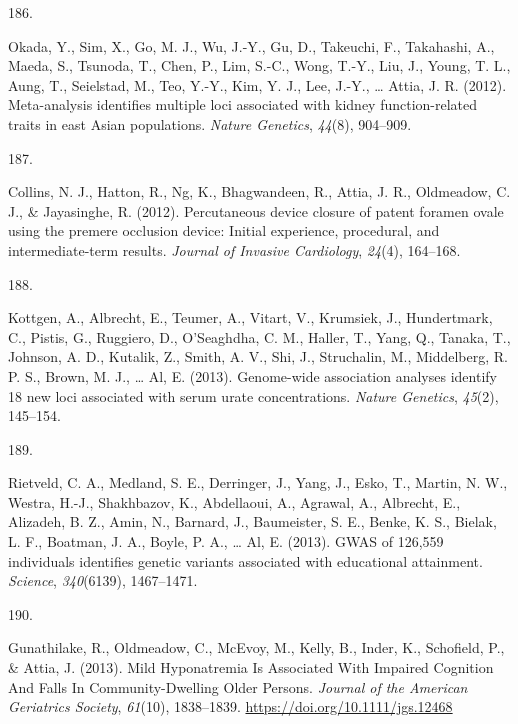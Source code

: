 \documentclass[11pt, a4paper]{awesome-cv}
\newlength{\csllabelwidth}
\newcommand{\CSLLeftMargin}[1]{\parbox[t]{\csllabelwidth}{#1}}
\newcommand{\CSLRightInline}[1]{\parbox[t]{\linewidth - \csllabelwidth}{#1}}
\begin{document}
\leavevmode\hypertarget{ref-okada_meta-analysis_2012}{}%
\CSLLeftMargin{186. }
\CSLRightInline{Okada, Y., Sim, X., Go, M. J., Wu, J.-Y., Gu, D.,
Takeuchi, F., Takahashi, A., Maeda, S., Tsunoda, T., Chen, P., Lim,
S.-C., Wong, T.-Y., Liu, J., Young, T. L., Aung, T., Seielstad, M., Teo,
Y.-Y., Kim, Y. J., Lee, J.-Y., \ldots{} Attia, J. R. (2012).
Meta-analysis identifies multiple loci associated with kidney
function-related traits in east Asian populations. \emph{Nature
Genetics}, \emph{44}(8), 904--909.}

\leavevmode\hypertarget{ref-collins_percutaneous_2012}{}%
\CSLLeftMargin{187. }
\CSLRightInline{Collins, N. J., Hatton, R., Ng, K., Bhagwandeen, R.,
Attia, J. R., Oldmeadow, C. J., \& Jayasinghe, R. (2012). Percutaneous
device closure of patent foramen ovale using the premere occlusion
device: Initial experience, procedural, and intermediate-term results.
\emph{Journal of Invasive Cardiology}, \emph{24}(4), 164--168.}

\leavevmode\hypertarget{ref-kottgen_genome-wide_2013}{}%
\CSLLeftMargin{188. }
\CSLRightInline{Kottgen, A., Albrecht, E., Teumer, A., Vitart, V.,
Krumsiek, J., Hundertmark, C., Pistis, G., Ruggiero, D., O'Seaghdha, C.
M., Haller, T., Yang, Q., Tanaka, T., Johnson, A. D., Kutalik, Z.,
Smith, A. V., Shi, J., Struchalin, M., Middelberg, R. P. S., Brown, M.
J., \ldots{} Al, E. (2013). Genome-wide association analyses identify 18
new loci associated with serum urate concentrations. \emph{Nature
Genetics}, \emph{45}(2), 145--154.}

\leavevmode\hypertarget{ref-rietveld_gwas_2013}{}%
\CSLLeftMargin{189. }
\CSLRightInline{Rietveld, C. A., Medland, S. E., Derringer, J., Yang,
J., Esko, T., Martin, N. W., Westra, H.-J., Shakhbazov, K., Abdellaoui,
A., Agrawal, A., Albrecht, E., Alizadeh, B. Z., Amin, N., Barnard, J.,
Baumeister, S. E., Benke, K. S., Bielak, L. F., Boatman, J. A., Boyle,
P. A., \ldots{} Al, E. (2013). GWAS of 126,559 individuals identifies
genetic variants associated with educational attainment. \emph{Science},
\emph{340}(6139), 1467--1471.}

\leavevmode\hypertarget{ref-gunathilake_mild_2013}{}%
\CSLLeftMargin{190. }
\CSLRightInline{Gunathilake, R., Oldmeadow, C., McEvoy, M., Kelly, B.,
Inder, K., Schofield, P., \& Attia, J. (2013). Mild Hyponatremia Is
Associated With Impaired Cognition And Falls In Community-Dwelling Older
Persons. \emph{Journal of the American Geriatrics Society},
\emph{61}(10), 1838--1839. \url{https://doi.org/10.1111/jgs.12468}}
\end{document}
